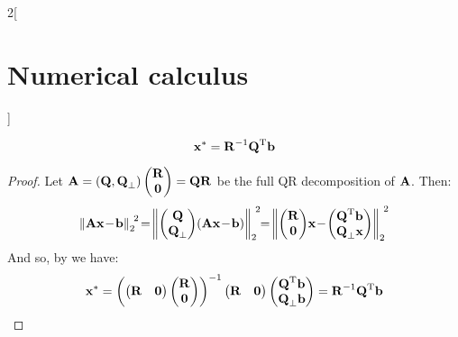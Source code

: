\documentclass[../../../main_math.tex]{subfiles}
\begin{document}
\begin{multicols}{2}[\section{Numerical calculus}]
\begin{proposition}
    $$
      \boldsymbol{\mathrm{x}}^* = \boldsymbol{\mathrm{R}}^{-1}{\boldsymbol{\mathrm{Q}}}^{\mathrm{T}}\boldsymbol{\mathrm{b}}
    $$
  \end{proposition}
  \begin{proof}
    Let $\boldsymbol{\mathrm{A}}=(\boldsymbol{\mathrm{Q}}, \boldsymbol{\mathrm{Q}}_\perp)\begin{pmatrix}
        \boldsymbol{\mathrm{R}} \\
        \boldsymbol{\mathrm{0}}
      \end{pmatrix}= \boldsymbol{\mathrm{Q}}\boldsymbol{\mathrm{R}}$ be the full QR decomposition of $\boldsymbol{\mathrm{A}}$. Then:
    $$
      {\norm{\vf{A}\vf{x}\!-\!\vf{b}}_2}^{\!2}\!=\!{\norm{\begin{pmatrix}
          \vf{Q} \\
          \vf{Q}_\perp
        \end{pmatrix}\!(\vf{Ax}\!-\!\vf{b})}_2}^{\!2}\!\!=\!{\norm{\begin{pmatrix}
          \vf{R} \\
          \vf{0}
        \end{pmatrix}\!\vf{x}\!-\!\begin{pmatrix}
          \transpose{\vf{Q}}\vf{b} \\
          \vf{Q}_\perp\vf{x}
        \end{pmatrix}}_2}^{\!2}
    $$
    And so, by  we have:
    $$
      \boldsymbol{\mathrm{x}}^*={\left(\begin{pmatrix}
          \boldsymbol{\mathrm{R}} & \boldsymbol{\mathrm{0}}
        \end{pmatrix}\begin{pmatrix}
          \boldsymbol{\mathrm{R}} \\
          \boldsymbol{\mathrm{0}}
        \end{pmatrix}\right)}^{-1}\begin{pmatrix}
        \boldsymbol{\mathrm{R}} & \boldsymbol{\mathrm{0}}
      \end{pmatrix}\begin{pmatrix}
        {\boldsymbol{\mathrm{Q}}}^{\mathrm{T}}\boldsymbol{\mathrm{b}} \\
        \boldsymbol{\mathrm{Q}}_\perp\boldsymbol{\mathrm{b}}
      \end{pmatrix}=\boldsymbol{\mathrm{R}}^{-1}{\boldsymbol{\mathrm{Q}}}^{\mathrm{T}}\boldsymbol{\mathrm{b}}
    $$
  \end{proof}
\end{multicols}
\end{document}
